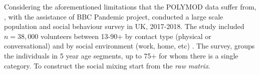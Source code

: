\documentclass[12pt]{article}
\begin{document}
Considering the aforementioned limitations that the POLYMOD data suffer from, \cite{Klepac2020}, with the assistance of BBC Pandemic project, conducted a large scale population and social behaviour survey in UK, 2017-2018. The study included $n=38,000$ volunteers between 13-90+ by contact type (physical or conversational) and by social environment (work, home, etc) . The survey, groups the individuals in 5 year age segments, up to 75+ for whom there is a single category. To construct the social mixing \cite{Klepac2020} start from the \textit{raw matrix}.



\end{document}
